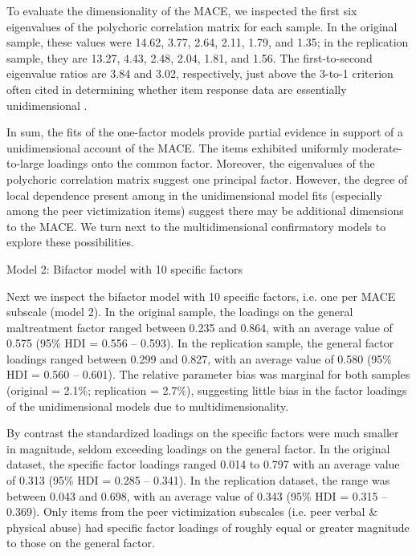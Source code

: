 \documentclass[letterpaper,man,natbib,floatsintext,longtable]{apa6}
\makeatletter
\renewcommand{\subsubsection}{\@startsection{subsubsection}{3}
  {\z@}%
  {\b@level@two@skip}{\e@level@two@skip}%
  {\normalfont\normalsize\bfseries}}
\makeatother
\begin{document}
To evaluate the dimensionality of the MACE, we inspected the first six eigenvalues of the polychoric correlation matrix for each sample. In the original sample, these values were 14.62, 3.77, 2.64, 2.11, 1.79, and 1.35; in the replication sample, they are 13.27, 4.43, 2.48, 2.04, 1.81, and 1.56. The first-to-second eigenvalue ratios are 3.84 and 3.02, respectively, just above the 3-to-1 criterion often cited in determining whether item response data are essentially unidimensional \citep{embretson2013item}. 

In sum, the fits of the one-factor models provide partial evidence in support of a unidimensional account of the MACE. The items exhibited uniformly moderate-to-large loadings onto the common factor. Moreover, the eigenvalues of the polychoric correlation matrix suggest one principal factor. However, the degree of local dependence present among in the unidimensional model fits (especially among the peer victimization items) suggest there may be additional dimensions to the MACE. We turn next to the multidimensional confirmatory models to explore these possibilities.

\subsubsection{Model 2: Bifactor model with 10 specific factors}

Next we inspect the bifactor model with 10 specific factors, i.e. one per MACE subscale (model 2). In the original sample, the loadings on the general maltreatment factor ranged between 0.235 and 0.864, with an average value of 0.575 (95\% HDI = 0.556 -- 0.593). In the replication sample, the general factor loadings ranged between 0.299 and 0.827, with an average value of 0.580 (95\% HDI = 0.560 -- 0.601). The relative parameter bias was marginal for both samples (original = 2.1\%; replication = 2.7\%), suggesting little bias in the factor loadings of the unidimensional models due to multidimensionality.  

By contrast the standardized loadings on the specific factors were much smaller in magnitude, seldom exceeding loadings on the general factor. In the original dataset, the specific factor loadings ranged 0.014 to 0.797 with an average value of 0.313 (95\% HDI = 0.285 -- 0.341). In the replication dataset, the range was between 0.043 and 0.698, with an average value of 0.343 (95\% HDI = 0.315 -- 0.369). Only items from the peer victimization subscales (i.e. peer verbal \& physical abuse) had specific factor loadings of roughly equal or greater magnitude to those on the general factor. 
\end{document}
